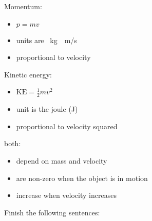 \documentclass[]{exam}
\begin{document}
\begin{questions}
\begin{center}
\end{center}

\begin{solution}

\phantom{.}

Momentum:

\begin{itemize}[itemsep=0pt,topsep=0pt]
    \item $p=mv$
    \item units are \SI{}{kg\cdot m/s}
    \item proportional to velocity
\end{itemize}

\bigskip

Kinetic energy:

\begin{itemize}[itemsep=0pt,topsep=0pt]
    \item $\mathrm{KE} = \frac{1}{2} mv^2$
    \item unit is the joule (J) 
    \item proportional to velocity squared
\end{itemize}

\bigskip

both:

\begin{itemize}[itemsep=0pt,topsep=0pt]
    \item depend on mass and velocity
    \item are non-zero when the object is in motion
    \item increase when velocity increases
\end{itemize}
\end{solution}

\question 
Finish the following sentences:

\end{questions}
\end{document}
